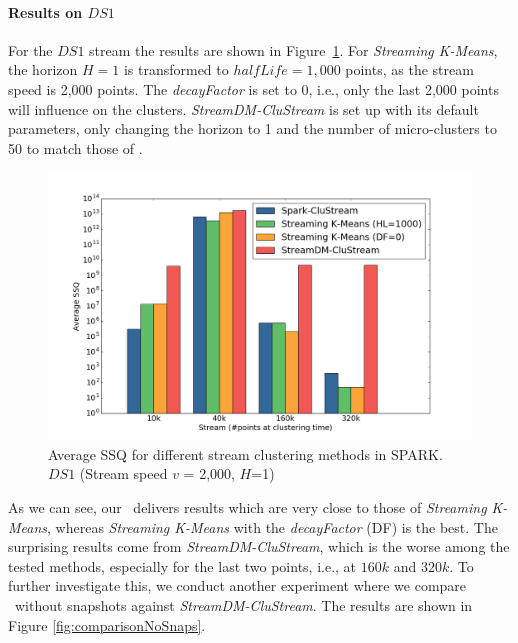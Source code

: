 \paragraph{Results on $DS1$}
For the $DS1$ stream the results are shown in Figure~\ref{fig:comparison2000}. %
For \textit{Streaming K-Means}, the horizon $H=1$ is transformed to $halfLife=1,000$ points, as the stream speed is 2,000 points. %
The \textit{decayFactor} is set to 0, i.e., only the last 2,000 points will influence on the clusters. %
\textit{StreamDM-CluStream} is set up with its default parameters, only changing the horizon to 1 and the number of micro-clusters to 50 to match those of \our.
%
\begin{figure}[h]
 \centering
 \includegraphics[scale=0.265]{./styles/comparison2000.png}
 \caption{Average SSQ for different stream clustering methods in SPARK. $DS1$ (Stream speed $v$ = 2,000, $H$=1)}
 \label{fig:comparison2000}
\end{figure}
%
As we can see, our \our~delivers results which are very close to those of \textit{Streaming K-Means}, whereas \textit{Streaming K-Means} with the \textit{decayFactor} (DF) is the best.
The surprising results come from \textit{StreamDM-CluStream}, which is the worse among the tested methods, especially for the last two points, i.e., at $160k$ and $320k$.
To further investigate this, we conduct another experiment where we compare \our~without snapshots against \textit{StreamDM-CluStream}. The results are shown in Figure \ref{fig:comparisonNoSnaps}.

